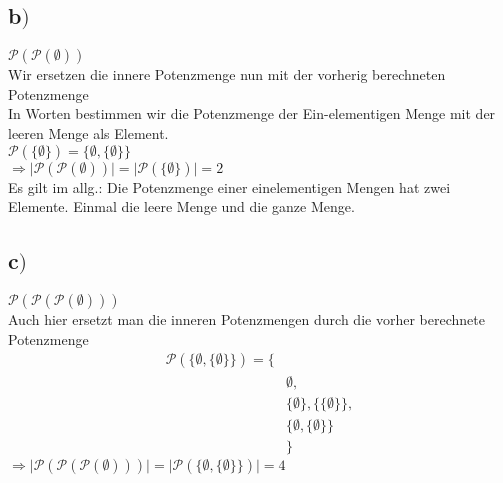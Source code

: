 \documentclass[18pt,a4paper]{article}
\begin{document}
	\subsection*{b$)$ }
	$\mathcal{P}(\mathcal{P}(\emptyset))$\\
	Wir ersetzen die innere Potenzmenge nun mit der vorherig berechneten Potenzmenge\\
	In Worten bestimmen wir die Potenzmenge der Ein-elementigen Menge mit der leeren Menge als Element.\\
	$\mathcal{P}(\{\emptyset \}) = \{\emptyset , \{\emptyset \}\} $\\
	$\Longrightarrow \lvert\mathcal{P}(\mathcal{P}(\emptyset))\rvert= \lvert\mathcal{P}(\{\emptyset \})\rvert = 2$\\
	Es gilt im allg.: Die Potenzmenge einer einelementigen Mengen hat zwei Elemente. Einmal die leere Menge und die ganze Menge.\\


	\subsection*{c$)$ }
	$\mathcal{P}(\mathcal{P}(\mathcal{P}(\emptyset)))$\\
	Auch hier ersetzt man die inneren Potenzmengen durch die vorher berechnete Potenzmenge\\
	
	\begin{align*}
	\mathcal{P}(\{\emptyset , \{\emptyset \}\} ) = \{ &\\
	&\emptyset ,\\
	&\{\emptyset\},\{\{\emptyset \}\},\\
	&\{\emptyset , \{\emptyset \}\}\\
	&\}
	\end{align*}
	$\Longrightarrow \lvert \mathcal{P}(\mathcal{P}(\mathcal{P}(\emptyset))) \rvert = \lvert\mathcal{P}(\{\emptyset , \{\emptyset \}\} )\rvert = 4$
	
\end{document}
